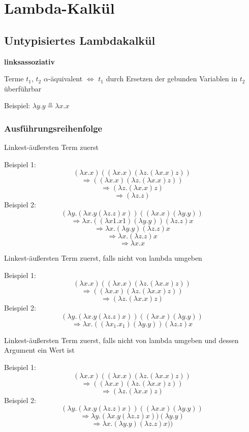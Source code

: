 \section{Lambda-Kalkül}
\subsection{Untypisiertes Lambdakalkül}
\textbf{linksassoziativ}
\begin{defi}
	Terme $t_1$,  $t_2$ $\alpha$-äquivalent $\Leftrightarrow$ $t_1$ durch Ersetzen der gebunden Variablen in $t_2$ überführbar
\end{defi}
Beispiel: $\lambda y.y \stackrel{\alpha}{=} \lambda x.x$

\subsubsection{Ausführungsreihenfolge}

\begin{defi}[Normalenreihenfolge]
	Linkest-äu\ss{}ersten Term zuerst
\end{defi}
Beispiel 1:\\
$$(\lambda x.x)((\lambda x.x) (\lambda z. (\lambda x.x) z))$$
$$ \Rightarrow ((\lambda x.x) (\lambda z. (\lambda x.x) z))$$
$$ \Rightarrow (\lambda z. (\lambda x.x) z)$$
$$ \Rightarrow (\lambda z. z)$$
Beispiel 2:\\
$$(\lambda y. (\lambda x. y (\lambda z.z) x)) ((\lambda x.x) (\lambda y.y))$$
$$\Rightarrow \lambda x. ((\lambda x1.x1) (\lambda y.y)) (\lambda z.z) x $$
$$\Rightarrow \lambda x. (\lambda y.y) (\lambda z.z) x$$
$$\Rightarrow \lambda x. (\lambda z.z) x $$
$$\Rightarrow \lambda x. x $$
\begin{defi}
		Linkest-äu\ss{}ersten Term zuerst, falls nicht von lambda umgeben
\end{defi}
Beispiel 1:\\
$$(\lambda x.x)((\lambda x.x) (\lambda z. (\lambda x.x) z))$$
$$ \Rightarrow ((\lambda x.x) (\lambda z. (\lambda x.x) z))$$
$$ \Rightarrow (\lambda z. (\lambda x.x) z)$$
Beispiel 2:\\
$$(\lambda y. (\lambda x. y (\lambda z.z) x)) ((\lambda x.x) (\lambda y.y))$$
$$\Rightarrow \lambda x. ((\lambda x_1.x_1) (\lambda y.y)) (\lambda z.z) x $$
\begin{defi}
	Linkest-äu\ss{}ersten Term zuerst, falls nicht von lambda umgeben und dessen Argument ein Wert ist
\end{defi}
Beispiel 1:\\
$$(\lambda x.x)((\lambda x.x) (\lambda z. (\lambda x.x) z))$$
$$ \Rightarrow ((\lambda x.x) (\lambda z. (\lambda x.x) z))$$
$$ \Rightarrow (\lambda z. (\lambda x.x) z)$$
Beispiel 2:\\
$$(\lambda y. (\lambda x. y (\lambda z.z) x)) ((\lambda x.x) (\lambda y.y))$$
$$\Rightarrow \lambda y. (\lambda x. y (\lambda z.z) x)) (\lambda y.y)$$
$$\Rightarrow \lambda x. (\lambda y.y) (\lambda z.z) x))$$

